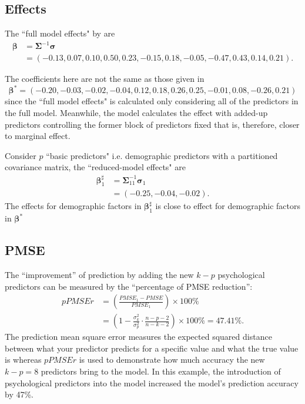\documentclass[11pt]{article}
\begin{document}
\subsection{Effects}
The ``full model effects" by \cite{narula1974predictive}are \begin{equation}\begin{aligned}
\label{eq:full.reg.coeff}
\boldsymbol{\beta} &= \boldsymbol{\Sigma}^{-1}\boldsymbol{\sigma} \\
&= (-0.13,  0.07,  0.10,  0.50,  0.23, -0.15,  0.18, -0.05, -0.47,  0.43,  0.14,  0.21). 
\end{aligned}\end{equation}

The coefficients here are not the same as those given in \cite{baker2008chronicpain}
$$\boldsymbol{\beta^*} = (-0.20, -0.03, -0.02, -0.04, 0.12, 0.18, 0.26, 0.25, -0.01, 0.08, -0.26, 0.21)$$
since the ``full model effects" is calculated only considering all of the predictors in the full model. Meanwhile, the model calculates the effect with added-up predictors controlling the former block of predictors fixed that is, therefore, closer to marginal effect.  

Consider $p$ ``basic predictors" i.e. demographic predictors with a partitioned covariance matrix, the ``reduced-model effects" are 
\begin{equation}\begin{aligned}
\label{eq:redu.reg.coeff}
\boldsymbol{\beta}_1^\sharp &= \boldsymbol{\Sigma}_{11}^{-1}\boldsymbol{\sigma}_1\\
&=(-0.25 , -0.04,  -0.02).
\end{aligned}\end{equation}
The effects for demographic factors in $\boldsymbol{\beta}_1^\sharp$ is close to effect for demographic factors in $\boldsymbol{\beta^*}$


\subsection{PMSE}
The “improvement” of prediction by adding the new $k-p$ psychological predictors can be measured by the “percentage of PMSE reduction”:
\begin{equation}\begin{aligned}
\label{eq:pPMSEr}
pPMSEr &= \left(\frac{PMSE_1 - PMSE}{PMSE_1} \right)\times 100\%\\
&= \left(1 - \frac{\sigma_k^2}{\sigma_p^2} \cdot \frac{n-p-2}{n-k-2}\right)\times 100\% = 47.41\%.
\end{aligned}\end{equation}
The prediction mean square error measures the expected squared distance between what your predictor predicts for a specific value and what the true value is whereas $pPMSEr$ is used to demonstrate how much accuracy the new $k-p = 8$ predictors bring to the model. In this example, the introduction of psychological predictors into the model increased the model's prediction accuracy by 47\%.
\end{document}
